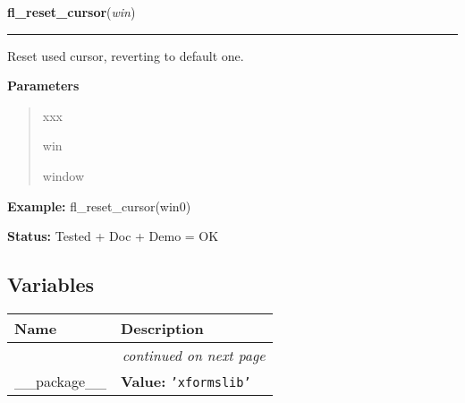 \hspace{.8\funcindent}\begin{boxedminipage}{\funcwidth}

    \raggedright \textbf{fl\_reset\_cursor}(\textit{win})

    \vspace{-1.5ex}

    \rule{\textwidth}{0.5\fboxrule}
\setlength{\parskip}{2ex}
    Reset used cursor, reverting to default one.

\setlength{\parskip}{1ex}
      \textbf{Parameters}
      \vspace{-1ex}

      \begin{quote}
        \begin{Ventry}{xxx}

          \item[win]

          window

        \end{Ventry}

      \end{quote}

\textbf{Example:} fl\_reset\_cursor(win0)



\textbf{Status:} Tested + Doc + Demo = OK



    \end{boxedminipage}



  \subsection{Variables}

    \vspace{-1cm}
\hspace{\varindent}\begin{longtable}{|p{\varnamewidth}|p{\vardescrwidth}|l}
\cline{1-2}
\cline{1-2} \centering \textbf{Name} & \centering \textbf{Description}& \\
\cline{1-2}
\endhead\cline{1-2}\multicolumn{3}{r}{\small\textit{continued on next page}}\\\endfoot\cline{1-2}
\endlastfoot\raggedright \_\-\_\-p\-a\-c\-k\-a\-g\-e\-\_\-\_\- & \raggedright \textbf{Value:} 
{\tt \texttt{'}\texttt{xformslib}\texttt{'}}&\\
\cline{1-2}
\end{longtable}

